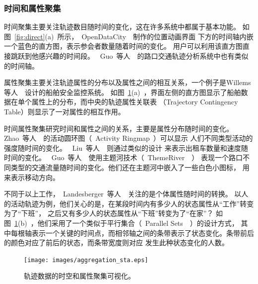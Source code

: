 \documentclass[12pt,twocolumn]{article}
\begin{document}
\subsubsection{时间和属性聚集}

时间聚集主要关注轨迹数目随时间的变化，这在许多系统中都属于基本功能。
如图~\ref{fig:direct}(a)~所示，~OpenDataCity~\citep{OpenDataCity2013}~制作的位置动画界面
下方的时间轴内嵌一个蓝色的直方图，表示参会者数量随着时间的变化。
用户可以利用该直方图直接跳跃到他感兴趣的时间段。
~Guo~等人~\citep{GuoWYZY2011}~的路口交通轨迹分析系统中也有类似的时间轴。

属性聚集主要关注轨迹属性的分布以及属性之间的相互关系，一个例子是Willems等人~\citep{WillemsHVJM2010}~设计的船舶安全监控系统。
如图~\ref{fig:aggregation_sta}(a)~，界面左侧的直方图显示了船舶数据在单个属性上的分布，而中央的轨迹属性关联表
（Trajectory Contingency Table）则显示了一对属性的相互作用。

时间属性聚集研究时间和属性之间的关系，主要是属性分布随时间的变化。
Zhao~等人~\citep{ZhaoFH2008}~的活动圆环图（~Activity Ringmap~）可以显示
人们不同类型活动的强度随时间的变化。
~Liu~等人~\citep{LiuGLLQN2011}~则通过类似的设计
来表示出租车数量和速度随时间的变化。
~Guo~等人~\citep{GuoWYZY2011}~使用主题河技术（~ThemeRiver~\citep{HavreHWN2002}~）
表现一个路口不同类型的交通流量随时间的变化。他们还在主题河中嵌入了一些白色小图标，
用来表示移动方向。

不同于以上工作，~Landesberger~等人~\citep{LandesbergerBAAT2012}~关注的是个体属性随时间的转换。
以人的活动轨迹为例，他们关心的是，在某段时间内有多少人的状态属性从“工作”转变为了“下班”，
之后又有多少人的状态属性从“下班”转变为了“在家”？
如图~\ref{fig:aggregation_sta}(b)~，他们采用了一个类似于平行集合（~Parallel Sets~\citep{KosaraBH2006}~）的设计方式，
其中每根轴表示一个关键的时间点，而相邻轴之间的条带表示了状态变化。条带前后的颜色对应了前后的状态，而条带宽度则对应
发生此种状态变化的人数。

\begin{figure}[!htb]
\centering
\texttt{[image: images/aggregation\_sta.eps]}
\caption{\label{fig:aggregation_sta}轨迹数据的时空和属性聚集可视化。
}
\end{figure}
\end{document}
